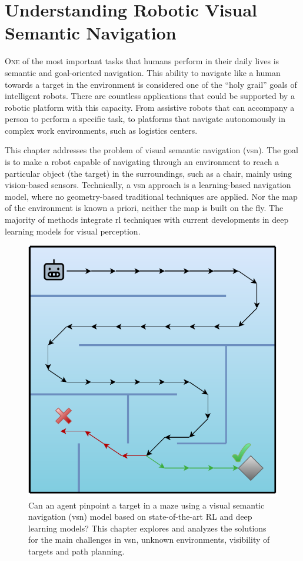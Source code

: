 \chapter{Understanding Robotic Visual Semantic Navigation}\label{ch:understanding-robotic-visual-semantic-navigation}

\lettrine{\textcolor{accent_color}{O}}{ne} of the most important tasks that humans perform in their daily lives is semantic and goal-oriented navigation.
This ability to navigate like a human towards a target in the environment is considered one of the ``holy grail'' goals of intelligent robots.
There are countless applications that could be supported by a robotic platform with this capacity.
From assistive robots that can accompany a person to perform a specific task, to platforms that navigate autonomously in complex work environments, such as logistics centers.

This chapter addresses the problem of visual semantic navigation (\acrshort{vsn}).
The goal is to make a robot capable of navigating through an environment to reach a particular object (the target) in the surroundings, such as a chair, mainly using vision-based sensors.
Technically, a \acrshort{vsn} approach is a learning-based navigation model, where no geometry-based traditional techniques are applied.
Nor the map of the environment is known a priori, neither the map is built on the fly.
The majority of methods integrate \acrshort{rl} techniques with current developments in deep learning models for visual perception.

\begin{figure}
    \centering
    \includegraphics[width=0.6\linewidth]{figures/understanding_vsn/graphical_abstract}
    \caption{Can an agent pinpoint a target in a maze using a visual semantic navigation (\acrshort{vsn}) model based on state-of-the-art RL and deep learning models? This chapter explores and analyzes the solutions for the main challenges in \acrshort{vsn}, \ie unknown environments, visibility of targets and path planning.}
    \label{fig:graphical_abstract}
\end{figure}

